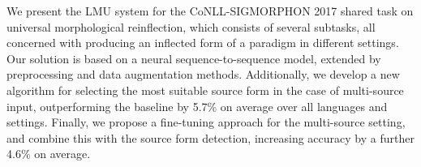 We present the LMU system for the CoNLL-SIGMORPHON 2017 shared task on universal morphological reinflection, which consists of several subtasks, all concerned with producing an inflected form of a paradigm in different settings. Our solution is based on a neural sequence-to-sequence model, extended by preprocessing and data augmentation methods. Additionally, we develop a new algorithm for selecting the most suitable source form in the case of multi-source input, outperforming the baseline by 5.7\% on average over all languages and settings. Finally, we propose a fine-tuning approach for the multi-source setting, and combine this with the source form detection, increasing accuracy by a further 4.6\% on average.
